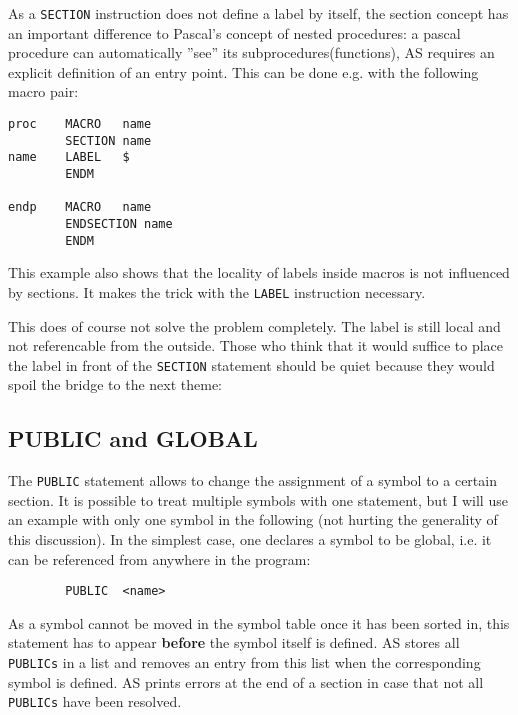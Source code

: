 \documentclass[12pt,twoside]{report}
\makeatletter
\newcommand{\bb}[1]{{\bf #1}}
\newcommand{\tty}[1]{{\tt #1}}
\newcommand{\ttindex}[1]{\index{#1@{\tt #1}}}
\newcommand{\asname}{{AS}}
\makeatother
\begin{document}
As a \tty{SECTION} instruction does not define a label by itself, the
section concept has an important difference to Pascal's concept of
nested procedures: a pascal procedure can automatically ''see'' its
subprocedures(functions), \asname{} requires an explicit definition of an
entry point.  This can be done e.g. with the following macro pair:
\begin{verbatim}
proc    MACRO   name
        SECTION name
name    LABEL   $
        ENDM

endp    MACRO   name
        ENDSECTION name
        ENDM
\end{verbatim}
This example also shows that the locality of labels inside macros
is not influenced by sections.  It makes the trick with the \tty{LABEL}
instruction necessary.

This does of course not solve the problem completely.  The label is
still local and not referencable from the outside.  Those who think
that it would suffice to place the label in front of the \tty{SECTION}
statement should be quiet because they would spoil the bridge to the
next theme:


\subsection{PUBLIC and GLOBAL}
\ttindex{PUBLIC}\ttindex{GLOBAL}

The \tty{PUBLIC} statement allows to change the assignment of a symbol to
a certain section.  It is possible to treat multiple symbols with one
statement, but I will use an example with only one symbol in the following
(not hurting the generality of this discussion).  In the simplest case,
one declares a symbol to be global, i.e. it can be referenced from
anywhere in the program:
\begin{verbatim}
        PUBLIC  <name>
\end{verbatim}
As a symbol cannot be moved in the symbol table once it has been sorted
in, this statement has to appear \bb{before} the symbol itself is
defined.  \asname{} stores all \tty{PUBLICs} in a list and removes an entry from
this list when the corresponding symbol is defined.  \asname{} prints errors at
the end of a section in case that not all \tty{PUBLICs} have been
resolved.
\end{document}
